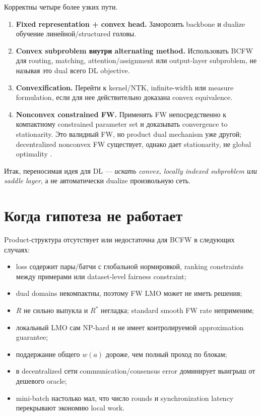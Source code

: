 \documentclass[11pt,a4paper]{article}
\begin{document}
Корректны четыре более узких пути.
\begin{enumerate}
  \item \textbf{Fixed representation + convex head.} Заморозить backbone и dualize обучение линейной/structured головы.
  \item \textbf{Convex subproblem внутри alternating method.} Использовать BCFW для routing, matching, attention/assignment или output-layer subproblem, не называя это dual всего DL objective.
  \item \textbf{Convexification.} Перейти к kernel/NTK, infinite-width или measure formulation, если для нее действительно доказана convex equivalence.
  \item \textbf{Nonconvex constrained FW.} Применять FW непосредственно к компактному constrained parameter set и доказывать convergence to stationarity. Это валидный FW, но product dual mechanism уже другой; decentralized nonconvex FW существует, однако дает stationarity, не global optimality \citep{wai2017decentralized}.
\end{enumerate}

Итак, переносимая идея для DL --- \emph{искать convex, locally indexed subproblem или saddle layer}, а не автоматически dualize произвольную сеть.

\section{Когда гипотеза не работает}

Product-структура отсутствует или недостаточна для BCFW в следующих случаях:
\begin{itemize}
  \item loss содержит пары/батчи с глобальной нормировкой, ranking constraints между примерами или dataset-level fairness constraint;
  \item dual domains некомпактны, поэтому FW LMO может не иметь решения;
  \item \(R\) не сильно выпукла и \(R^*\) негладка; standard smooth FW rate неприменим;
  \item локальный LMO сам NP-hard и не имеет контролируемой approximation guarantee;
  \item поддержание общего \(w(a)\) дороже, чем полный проход по блокам;
  \item в decentralized сети communication/consensus error доминирует выигрыш от дешевого oracle;
  \item mini-batch настолько мал, что число rounds и synchronization latency перекрывают экономию local work.
\end{itemize}
\end{document}
